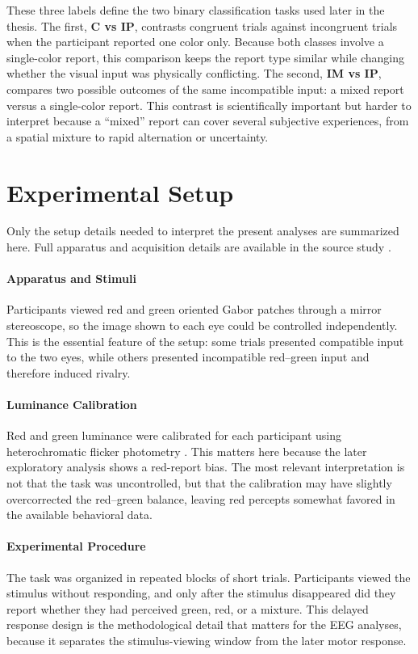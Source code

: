 \documentclass[11pt,a4paper,chapterprefix=false,parskip=false]{scrreprt}
\begin{document}
These three labels define the two binary classification tasks used later in the thesis. The first, \textbf{C vs IP}, contrasts congruent trials against incongruent trials when the participant reported one color only. Because both classes involve a single-color report, this comparison keeps the report type similar while changing whether the visual input was physically conflicting. The second, \textbf{IM vs IP}, compares two possible outcomes of the same incompatible input: a mixed report versus a single-color report. This contrast is scientifically important but harder to interpret because a ``mixed'' report can cover several subjective experiences, from a spatial mixture to rapid alternation or uncertainty.


\section{Experimental Setup}
\label{sec:experimental-setup}
Only the setup details needed to interpret the present analyses are summarized here. Full apparatus and acquisition details are available in the source study \citep{drew_binocular_2026}.

\paragraph{Apparatus and Stimuli}
Participants viewed red and green oriented Gabor patches through a mirror stereoscope, so the image shown to each eye could be controlled independently. This is the essential feature of the setup: some trials presented compatible input to the two eyes, while others presented incompatible red--green input and therefore induced rivalry.

\paragraph{Luminance Calibration}
Red and green luminance were calibrated for each participant using heterochromatic flicker photometry \citep{cavanagh_equiluminance_1987}. This matters here because the later exploratory analysis shows a red-report bias. The most relevant interpretation is not that the task was uncontrolled, but that the calibration may have slightly overcorrected the red--green balance, leaving red percepts somewhat favored in the available behavioral data.

\paragraph{Experimental Procedure}
The task was organized in repeated blocks of short trials. Participants viewed the stimulus without responding, and only after the stimulus disappeared did they report whether they had perceived green, red, or a mixture. This delayed response design is the methodological detail that matters for the EEG analyses, because it separates the stimulus-viewing window from the later motor response.
\end{document}
